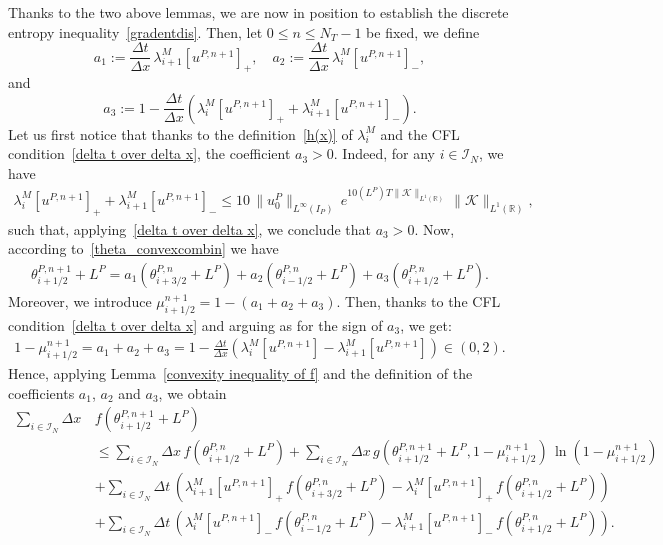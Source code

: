 \documentclass[11pt]{amsart}
\newcommand{\K}{\mathcal{K}}
\newcommand{\R}{\mathbb{R}}
\newcommand{\I}{\mathcal{I}_N}
\begin{document}
Thanks to the two above lemmas, we are now in position to establish the discrete entropy inequality~\eqref{gradentdis}. Then, let $0\leq n \leq N_T-1$ be fixed, we define
\[
a_1 := \frac{\Delta t}{\Delta x} \, \lambda^M_{i+1}\left[u^{P,n+1}\right]_+, \quad a_2 := \frac{\Delta t}{\Delta x} \, \lambda^M_i\left[u^{P,n+1}\right]_-,
\]
and
\[
a_3 := 1- \frac{\Delta t}{\Delta x}\left(\lambda^M_{i} \left[u^{P, n+1 }\right]_+ +  \lambda^M_{i + 1} \left[u^{P,n+1}\right]_-\right).
\]
Let us first notice that thanks to the definition~\eqref{h(x)} of $\lambda^M_i$ and the CFL condition~\eqref{delta t over delta x}, the coefficient $a_3>0$. Indeed, for any $i \in \I$, we have
\begin{align*}
\lambda^M_{i} \left[u^{P, n+1 }\right]_+ +  \lambda^M_{i + 1} \left[u^{P,n+1}\right]_- \leq 10 \, \|u^P_0\|_{L^\infty(I_P)} \, e^{10(L^P) T \|\K\|_{L^1(\R)}} \, \|\K\|_{L^1(\R)},
\end{align*}
such that, applying~\eqref{delta t over delta x}, we conclude that $a_3>0$. Now, according to~\eqref{theta_convexcombin} we have
\begin{align*}
    \theta^{P,n+1}_{i+1/2} + L^P = a_1 \left(\theta^{P,n}_{i+3/2} + L^P \right) + a_2 \left( \theta^{P,n}_{i-1/2} + L^P\right) + a_3 \left(\theta^{P,n}_{i+1/2} + L^P\right).
\end{align*}
Moreover, we introduce $\mu^{n+1}_{i+1/2} = 1-(a_1 + a_2 + a_3)$. Then, thanks to the CFL condition~\eqref{delta t over delta x} and arguing as for the sign of $a_3$, we get:
\begin{align}\label{defmu}
1 - \mu_{i +1/2}^{n+1} = a_1+a_2+a_3 = 1 - \frac{\Delta t}{\Delta x}\left(\lambda^M_{i} \left[u^{P, n+1 }\right] -  \lambda^M_{i + 1} \left[u^{P, n+1}\right]\right) \in (0,2).
\end{align}
Hence, applying Lemma~\ref{convexity inequality of f} and the definition of the coefficients $a_1$, $a_2$ and $a_3$, we obtain
\begin{align*}
\sum_{i\in\I} \Delta x\, &f\left(\theta_{i +1/2}^{P, n+1} + L^P\right) \\
&\leq  \sum_{i \in\I} \Delta x \, f\left(\theta_{i + 1/2}^{P, n} + L^P\right) + \sum_{i\in\I} \Delta x \, g\left(\theta_{i +1/2}^{P,n+1} + L^P, 1-\mu^{n+1}_{i+1/2}\right) \,\ln\left(1 - \mu_{i +1/2}^{n+1}\right) \\
&+ \sum_{i\in\I} \Delta t \, \left( \lambda^M_{i + 1} [u^{P, n+1}]_+ \, f\left(\theta_{i +3/2}^{P, n} + L^P\right) - \lambda^M_i[u^{P,n+1}]_+ \, f\left(\theta_{i +1/2}^{P, n } + L^P\right)\right)\\ 
& + \sum_{i \in \I} \Delta t \, \left(\lambda^M_i[u^{P, n+1}]_- \, f\left(\theta_{i -1/2}^{P, n } + L^P\right) - \lambda^M_{i + 1}[u^{P, n+1}]_- \, f\left(\theta_{i +1/2}^{P, n} + L^P\right)\right).
\end{align*}
\end{document}
